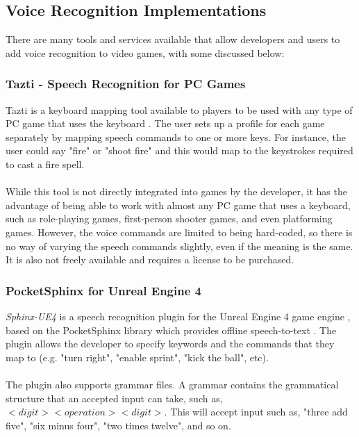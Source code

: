 \documentclass[11pt]{article}
\begin{document}
\subsection{Voice Recognition Implementations}

There are many tools and services available that allow developers and users to add voice recognition to video games, with some discussed below:

\subsubsection{Tazti - Speech Recognition for PC Games}

Tazti is a keyboard mapping tool available to players to be used with any type of PC game that uses the keyboard \cite{RefWorks:28}. The user sets up a profile for each game separately by mapping speech commands to one or more keys. For instance, the user could say "fire" or "shoot fire" and this would map to the keystrokes required to cast a fire spell.
\\
\\
While this tool is not directly integrated into games by the developer, it has the advantage of being able to work with almost any PC game that uses a keyboard, such as role-playing games, first-person shooter games, and even platforming games. However, the voice commands are limited to being hard-coded, so there is no way of varying the speech commands slightly, even if the meaning is the same. It is also not freely available and requires a license to be purchased.

\subsubsection{PocketSphinx for Unreal Engine 4}

\textit{Sphinx-UE4} is a speech recognition plugin for the Unreal Engine 4 game engine \cite{RefWorks:104}, based on the PocketSphinx library which provides offline speech-to-text \cite{RefWorks:105}. The plugin allows the developer to specify keywords and the commands that they map to (e.g. "turn right", "enable sprint", "kick the ball", etc).
\\
\\
The plugin also supports grammar files. A grammar contains the grammatical structure that an accepted input can take, such as, $<digit> <operation> <digit>$. This will accept input such as, "three add five", "six minus four", "two times twelve", and so on.
\end{document}
